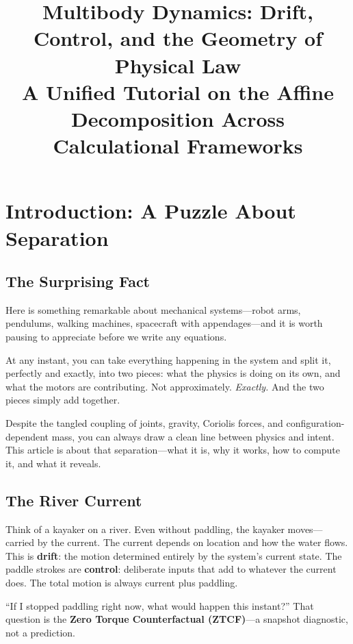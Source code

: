 \documentclass[11pt]{article}
\title{Multibody Dynamics: Drift, Control, and the Geometry of Physical Law\\[0.5em]
\large A Unified Tutorial on the Affine Decomposition Across Calculational Frameworks}
\author{}
\date{}
\begin{document}
\maketitle
\tableofcontents
\newpage

\section{Introduction: A Puzzle About Separation}\label{sec:introduction}

\subsection{The Surprising Fact}

Here is something remarkable about mechanical systems---robot arms, pendulums, walking machines, spacecraft with appendages---and it is worth pausing to appreciate before we write any equations.

At any instant, you can take everything happening in the system and split it, perfectly and exactly, into two pieces: what the physics is doing on its own, and what the motors are contributing. Not approximately. \emph{Exactly.} And the two pieces simply add together.

Despite the tangled coupling of joints, gravity, Coriolis forces, and configuration-dependent mass, you can always draw a clean line between physics and intent. This article is about that separation---what it is, why it works, how to compute it, and what it reveals.

\subsection{The River Current}

Think of a kayaker on a river. Even without paddling, the kayaker moves---carried by the current. The current depends on location and how the water flows. This is \textbf{drift}: the motion determined entirely by the system's current state. The paddle strokes are \textbf{control}: deliberate inputs that add to whatever the current does. The total motion is always current plus paddling.

``If I stopped paddling right now, what would happen this instant?'' That question is the \textbf{Zero Torque Counterfactual (ZTCF)}---a snapshot diagnostic, not a prediction.
\end{document}
